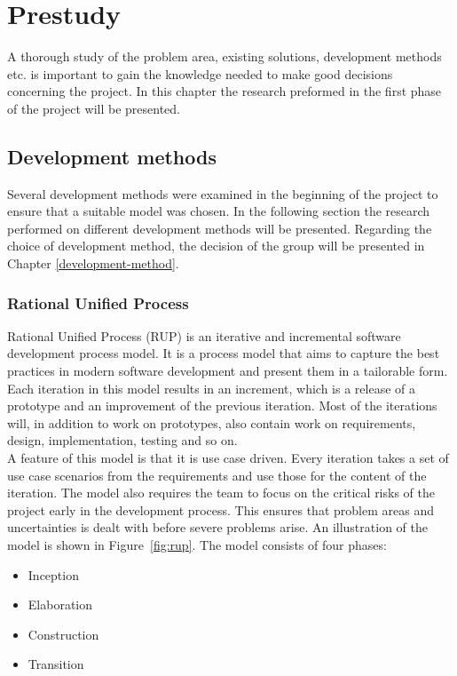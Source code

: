 \chapter{Prestudy}

\label{prestudy}

A thorough study of the problem area, existing solutions, development methods etc. is important to gain the knowledge needed to make good decisions concerning the project. In this chapter the research preformed in the first phase of the project will be presented.

\section{Development methods}
Several development methods were examined in the beginning of the project to ensure that a suitable model was chosen. In the following section the research performed on different development methods will be presented. Regarding the choice of development method, the decision of the group will be presented in Chapter \ref{development-method}.

\subsection{Rational Unified Process}
Rational Unified Process (RUP) is an iterative and incremental software development process model. It is a process model that aims to capture the best practices in modern software development and present them in a tailorable form.\cite{kruchten} Each iteration in this model results in an increment, which is a release of a prototype and an improvement of the previous iteration. Most of the iterations will, in addition to work on prototypes, also contain work on requirements, design, implementation, testing and so on.\\
\newline
A feature of this model is that it is use case driven. Every iteration takes a set of use case scenarios from the requirements and use those for the content of the iteration. The model also requires the team to focus on the critical risks of the project early in the development process. This ensures that problem areas and uncertainties is dealt with before severe problems arise. An illustration of the model is shown in Figure~\ref{fig:rup}.
\newline
The model consists of four phases:

\begin{itemize}
\item{Inception}
\item{Elaboration}
\item{Construction}
\item{Transition}
\end{itemize}

